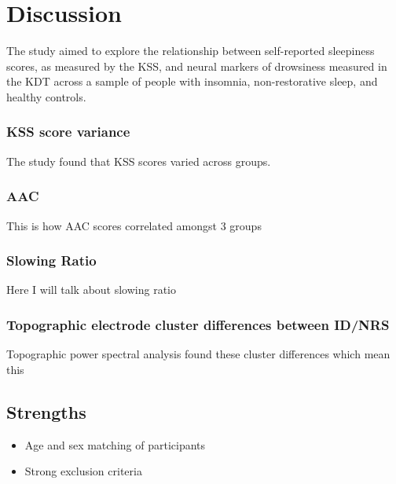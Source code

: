 \documentclass[12pt,a4paper,]{report}
\providecommand{\tightlist}{%
  \setlength{\itemsep}{0pt}\setlength{\parskip}{0pt}}
\begin{document}
\newpage

\chapter{Discussion}\label{sec:discussion}

The study aimed to explore the relationship between self-reported
sleepiness scores, as measured by the KSS, and neural markers of
drowsiness measured in the KDT across a sample of people with insomnia,
non-restorative sleep, and healthy controls.

\subsection{KSS score variance}\label{kss-score-variance-1}

The study found that KSS scores varied across groups.

\subsection{AAC}\label{aac-1}

This is how AAC scores correlated amongst 3 groups

\subsection{Slowing Ratio}\label{slowing-ratio-1}

Here I will talk about slowing ratio

\subsection{Topographic electrode cluster differences between
ID/NRS}\label{topographic-electrode-cluster-differences-between-idnrs-1}

Topographic power spectral analysis found these cluster differences
which mean this

\section{Strengths}\label{strengths-1}

\begin{itemize}
\tightlist
\item
  Age and sex matching of participants
\item
  Strong exclusion criteria
\end{itemize}
\end{document}
